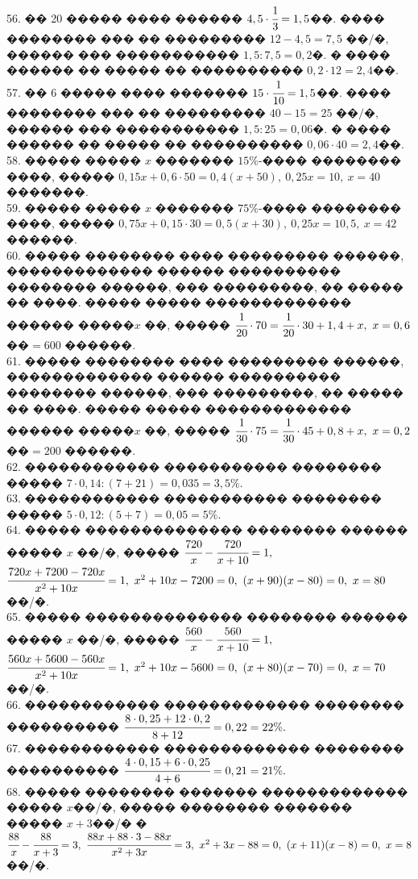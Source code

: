 \documentclass[12pt]{article}
\begin{document}
56. �� 20 ����� ���� ������ $4,5\cdot\cfrac{1}{3}=1,5$��. ���� �������� ��� �� ��������� $12-4,5=7,5\text{ ��/�},$ ������ ��� ����������� $1,5:7,5=0,2$�. � ���� ������ �� ����� �� ���������� $0,2\cdot12=2,4$��.\\
57. �� 6 ����� ���� ������� $15\cdot\cfrac{1}{10}=1,5$��. ���� �������� ��� �� ��������� $40-15=25\text{ ��/�},$ ������ ��� ����������� $1,5:25=0,06$�. � ���� ������ �� ����� �� ���������� $0,06\cdot40=2,4$��.\\
58. ����� ����� $x$ ������� $15\%$-���� �������� ����, ����� $0,15x+0,6\cdot50=0,4(x+50),\ 0,25x=10,\ x=40$ �������.\\
59. ����� ����� $x$ ������� $75\%$-���� �������� ����, ����� $0,75x+0,15\cdot30=0,5(x+30),\ 0,25x=10,5,\ x=42$ ������.\\
60. ����� �������� ���� ��������� ������, ������������� ������ ���������� �������� ������, ��� ���������, �� ����� �� ����. ����� ����� ������������� ������ �����$x$ ��, ����� $\cfrac{1}{20}\cdot70=\cfrac{1}{20}\cdot30+1,4+x,\ x=0,6$��$=600$ ������.\\
61. ����� �������� ���� ��������� ������, ������������� ������ ���������� �������� ������, ��� ���������, �� ����� �� ����. ����� ����� ������������� ������ �����$x$ ��, ����� $\cfrac{1}{30}\cdot75=\cfrac{1}{30}\cdot45+0,8+x,\ x=0,2$��$=200$ ������.\\
62. ������������ ����������� �������� ����� $7\cdot0,14:(7+21)=0,035=3,5\%.$\\
63. ������������ ����������� �������� ����� $5\cdot0,12:(5+7)=0,05=5\%.$\\
64. ����� �������������� �������� ������ ����� $x$ ��/�, ����� $\cfrac{720}{x}-\cfrac{720}{x+10}=1,$\\$ \cfrac{720x+7200-720x}{x^2+10x}=1,\ x^2+10x-7200=0,\
(x+90)(x-80)=0,\ x=80$��/�.\\
65. ����� �������������� �������� ������ ����� $x$ ��/�, ����� $\cfrac{560}{x}-\cfrac{560}{x+10}=1,$\\$ \cfrac{560x+5600-560x}{x^2+10x}=1,\ x^2+10x-5600=0,\
(x+80)(x-70)=0,\ x=70$��/�.\\
66. ������������ ������������� �������� ���������� $\cfrac{8\cdot0,25+12\cdot0,2}{8+12}=0,22=22\%.$\\
67. ������������ ������������� �������� ���������� $\cfrac{4\cdot0,15+6\cdot0,25}{4+6}=0,21=21\%.$\\
68. ����� �������� ������� ������������� ����� $x$��/�, ����� �������� ������� ����� $x+3$��/� � $\cfrac{88}{x}-\cfrac{88}{x+3}=3,\ \cfrac{88x+88\cdot3-88x}{x^2+3x}=3,\ x^2+3x-88=0,\ (x+11)(x-8)=0,\ x=8$��/�.\\
\end{document}
